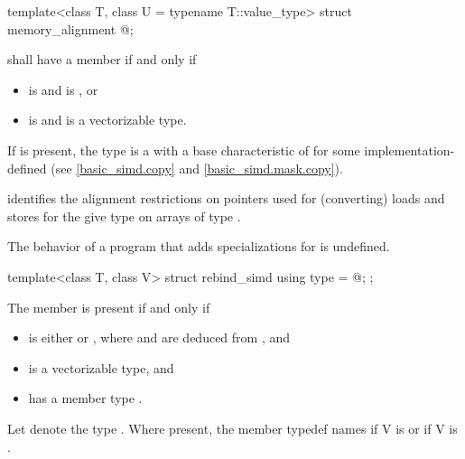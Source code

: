\begin{itemdecl}
template<class T, class U = typename T::value_type> struct memory_alignment { @\seebelow@ };
\end{itemdecl}

\begin{itemdescr}
\pnum
{} shall have a member  if and only if
\begin{itemize}
  \item {} is  and  is , or
  \item {} is  and  is a vectorizable type.
\end{itemize}

\pnum
If  is present, the type  is a  with a base characteristic of  for some implementation-defined  (see \ref{basic_simd.copy} and \ref{basic_simd.mask.copy}). \begin{note} identifies the alignment restrictions on pointers used for (converting) loads and stores for the give type  on arrays of type .\end{note}

\pnum
The behavior of a program that adds specializations for  is undefined.
\end{itemdescr}

\begin{itemdecl}
template<class T, class V> struct rebind_simd { using type = @\seebelow@; };
\end{itemdecl}

\begin{itemdescr}
  \pnum
  The member  is present if and only if
  \begin{itemize}
    \item {} is either  or , where  and  are deduced from , and
    \item {} is a vectorizable type, and
    \item {} has a member type .
  \end{itemize}

  \pnum
  Let  denote the type .
  Where present, the member typedef  names
   if \tcode V is  or
   if \tcode V is .
\end{itemdescr}

